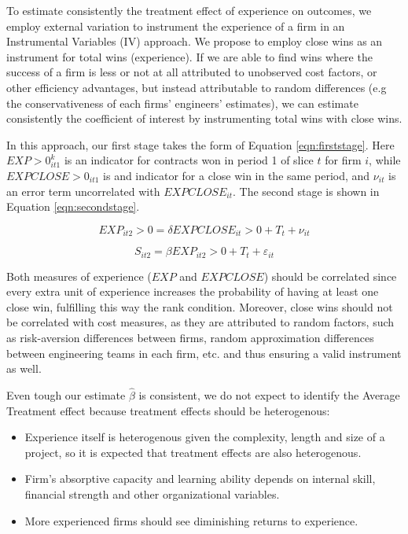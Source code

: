 To estimate consistently the treatment effect of experience on outcomes, we employ external variation to instrument the experience of a firm in an Instrumental Variables (IV) approach. We propose to employ close wins as an instrument for total wins (experience). If we are able to find wins where the success of a firm is less or not at all attributed to unobserved cost factors, or other efficiency advantages, but instead attributable to random differences (e.g the conservativeness of each firms' engineers' estimates), we can estimate consistently the coefficient of interest by instrumenting total wins with close wins.

In this approach, our first stage takes the form of Equation \ref{eqn:firststage}. Here $EXP>0_{it1}^k$ is an indicator for contracts won in period 1 of slice $t$ for firm $i$, while $EXPCLOSE>0_{it1}$ is and indicator for a close win in the same period, and $\nu_{it}$ is an error term uncorrelated with $EXPCLOSE_{it}$. The second stage is shown in Equation \ref{eqn:secondstage}.

\begin{equation}
\label{eqn:firststage}
EXP_{it2}>0= \delta EXPCLOSE_{it}>0+T_t+\nu_{it}
\end{equation}

\begin{equation}
\label{eqn:secondstage}
S_{it2}= \beta EXP_{it2}>0+T_t+\varepsilon_{it}
\end{equation}

Both measures of experience ($EXP$ and $EXPCLOSE$) should be correlated since every extra unit of experience increases the probability of having at least one close win, fulfilling this way the rank condition. Moreover, close wins should not be correlated with cost measures, as they are attributed to random factors, such as risk-aversion differences between firms, random approximation differences between engineering teams in each firm, etc. and thus ensuring a valid instrument as well.

Even tough our estimate $\hat{\beta}$ is consistent,
we do not expect to identify the Average Treatment effect because treatment effects should be heterogenous:
\begin{itemize}[itemsep=1pt]
  \item Experience itself is heterogenous given the complexity, length and size of a project, so it is expected that treatment effects are also heterogenous.
  \item Firm's absorptive capacity and learning ability depends on internal skill, financial strength and other organizational variables.
  \item More experienced firms should see diminishing returns to experience.
  \end{itemize}

